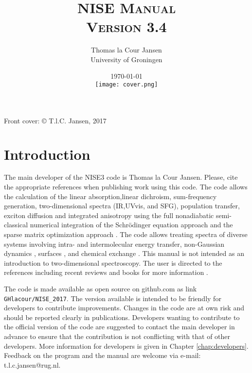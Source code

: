 \documentclass[12pt]{book}
\title{\textsc{NISE Manual\\ Version 3.4}}
\author{Thomas la Cour Jansen\\ University of Groningen}
\date{\today\\ \texttt{[image: cover.png]}}
\begin{document}
\maketitle

\thispagestyle{empty}
\rule{0mm}{0mm}
\noindent
\thispagestyle{empty}
Front cover: 
\copyright \/ T.l.C. Jansen, 2017
\setcounter{page}{1}
\thispagestyle{empty}
\clearpage

\setcounter{page}{1}


\chapter{Introduction}
The main developer of the NISE3 code is Thomas la Cour Jansen. Please, cite the appropriate
references 
\cite{Jansen.2006.JPCB.110.22910,Jansen.2009.ACR.42.1405,Jansen.2010.JCP.132.224503,Liang.2012.JCTC.8.1706,Liang.2013.JPCL.4.448}
when publishing work using this code. The code allows the calculation of the linear absorption,linear dichroism, sum-frequency generation, two-dimensional spectra (IR,UVvis, and SFG), population transfer, exciton diffusion and integrated anisotropy using the full nonadiabatic semi-classical numerical integration of the Schr\"{o}dinger equation approach
\cite{Jansen.2009.ACR.42.1405} and the sparse matrix optimization approach \cite{Liang.2012.JCTC.8.1706}. The code allows treating spectra of diverse systems involving
intra- and intermolecular energy transfer\cite{Jansen.2006.JPCB.110.22910,Cringus.2007.JCP.127.084507,Jansen.2008.BJ.94.1818,Dijkstra.2010.JPCA.114.7315,Jansen.2010.JCP.132.224503}, non-Gaussian dynamics \cite{Jansen.2009.JPCA.113.6260,Roy.2011.JPCB.115.5431}, surfaces \cite{Liang.2013.JPCL.4.448}, and chemical exchange \cite{Jansen.2007.JCP.127.234502}. This manual is not intended as an introduction to two-dimensional
spectroscopy. The user is directed to the references including recent reviews \cite{Hamm.1998.JPCB.102.6123,Hochstrasser.2001.CP.266.273,Cho.2008.CR.108.1331,Mukamel.2000.ARPC.51.691,Jansen.2009.ACR.42.1405} and books
for more information \cite{Cho.2009.B01,Mukamel.1995.B01,Hamm.2011.B01}.

The code is made available as open source on github.com as link {\tt GHlacour/NISE\_2017}. The version available is intended to be friendly for developers to contribute improvements. Changes in the code are at own risk and should be reported clearly in publications. Developers wanting to contribute to the official version of the code are suggested to contact the main developer in advance to ensure that the contribution is not conflicting with that of other developers. More information for developers is given in Chapter \ref{chap:developers}. Feedback on the program and the manual are welcome via e-mail: t.l.c.jansen@rug.nl. 
\end{document}
